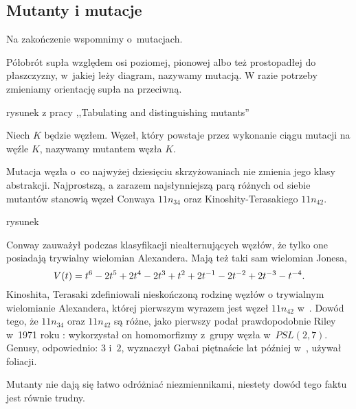 \subsection{Mutanty i mutacje}
\label{sec:mutant}
Na zakończenie wspomnimy o~mutacjach.

\begin{definition}[mutacja]
    Półobrót supła względem osi poziomej, pionowej albo też prostopadłej do płaszczyzny, w~jakiej leży diagram, nazywamy mutacją.
    W razie potrzeby zmieniamy orientację supła na przeciwną.
\end{definition}

\begin{tobedone}
rysunek z pracy ,,Tabulating and distinguishing mutants''
\end{tobedone}

\begin{definition}[mutant]
    \label{def:mutant}
    Niech $K$ będzie węzłem.
    Węzeł, który powstaje przez wykonanie ciągu mutacji na węźle $K$, nazywamy mutantem węzła $K$.
\end{definition}

Mutacja węzła o~co najwyżej dziesięciu skrzyżowaniach nie zmienia jego klasy abstrakcji.
Najprostszą, a zarazem najsłynniejszą parą różnych od siebie mutantów stanowią węzeł Conwaya $11n_{34}$ oraz Kinoshity-Terasakiego $11n_{42}$.

\begin{tobedone}
rysunek
\end{tobedone}

Conway zauważył podczas klasyfikacji niealternujących węzłów, że tylko one posiadają trywialny wielomian Alexandera.
Mają też taki sam wielomian Jonesa,
\begin{equation}
    V(t) = t^{6} -2t^5 +2t^4 -2t^3 +t^2 +2t^{-1} -2t^{-2} +2t^{-3} -t^{-4}.
\end{equation}
Kinoshita, Terasaki zdefiniowali nieskończoną rodzinę węzłów o trywialnym wielomianie Alexandera, której pierwszym wyrazem jest węzeł $11n_{42}$ w~\cite{kinoshita57}.
Dowód tego, że $11n_{34}$ oraz $11n_{42}$ są różne, jako pierwszy podał prawdopodobnie Riley w~1971 roku \cite{riley71}: wykorzystał on homomorfizmy z~grupy węzła w~$PSL(2, 7)$.
Genusy, odpowiednio: $3$ i~$2$, wyznaczył Gabai piętnaście lat później w~\cite{gabai86}, używał foliacji.

Mutanty nie dają się łatwo odróżniać niezmiennikami, niestety dowód tego faktu jest równie trudny.

